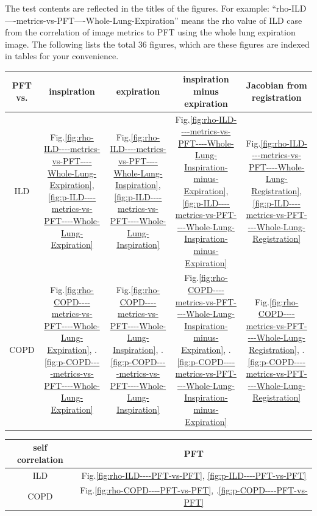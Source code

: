 \documentclass[12pt]{article}
\begin{document}
The test contents are reflected in the titles of the figures. For example: ``rho-ILD----metrics-vs-PFT----Whole-Lung-Expiration'' means the rho value of ILD case from the correlation of image metrics to PFT using the whole lung expiration image. The following lists the total 36 figures, which are these figures are indexed in tables for your convenience.

\noindent
\begin{tabular}{|c||c|c|c|c|}
\hline
PFT vs. & inspiration & expiration & inspiration minus expiration & Jacobian from registration \\
\hline
ILD
& Fig.\ref{fig:rho-ILD----metrics-vs-PFT----Whole-Lung-Expiration}, \ref{fig:p-ILD----metrics-vs-PFT----Whole-Lung-Expiration}
& Fig.\ref{fig:rho-ILD----metrics-vs-PFT----Whole-Lung-Inspiration}, \ref{fig:p-ILD----metrics-vs-PFT----Whole-Lung-Inspiration}
& Fig.\ref{fig:rho-ILD----metrics-vs-PFT----Whole-Lung-Inspiration-minus-Expiration}, \ref{fig:p-ILD----metrics-vs-PFT----Whole-Lung-Inspiration-minus-Expiration}
& Fig.\ref{fig:rho-ILD----metrics-vs-PFT----Whole-Lung-Registration}, \ref{fig:p-ILD----metrics-vs-PFT----Whole-Lung-Registration}
\\
\hline
COPD
& Fig.\ref{fig:rho-COPD----metrics-vs-PFT----Whole-Lung-Expiration}, .\ref{fig:p-COPD----metrics-vs-PFT----Whole-Lung-Expiration}
& Fig.\ref{fig:rho-COPD----metrics-vs-PFT----Whole-Lung-Inspiration}, .\ref{fig:p-COPD----metrics-vs-PFT----Whole-Lung-Inspiration}
& Fig.\ref{fig:rho-COPD----metrics-vs-PFT----Whole-Lung-Inspiration-minus-Expiration}, .\ref{fig:p-COPD----metrics-vs-PFT----Whole-Lung-Inspiration-minus-Expiration}
& Fig.\ref{fig:rho-COPD----metrics-vs-PFT----Whole-Lung-Registration}, .\ref{fig:p-COPD----metrics-vs-PFT----Whole-Lung-Registration}
\\
\hline
\end{tabular} 


\noindent
\begin{center}
\begin{tabular}{|c||c|}
\hline
self correlation & PFT \\
\hline
ILD
& Fig.\ref{fig:rho-ILD----PFT-vs-PFT}, \ref{fig:p-ILD----PFT-vs-PFT}
\\
\hline
COPD
& Fig.\ref{fig:rho-COPD----PFT-vs-PFT}, .\ref{fig:p-COPD----PFT-vs-PFT}
\\
\hline
\end{tabular} 
\end{center}
\end{document}
